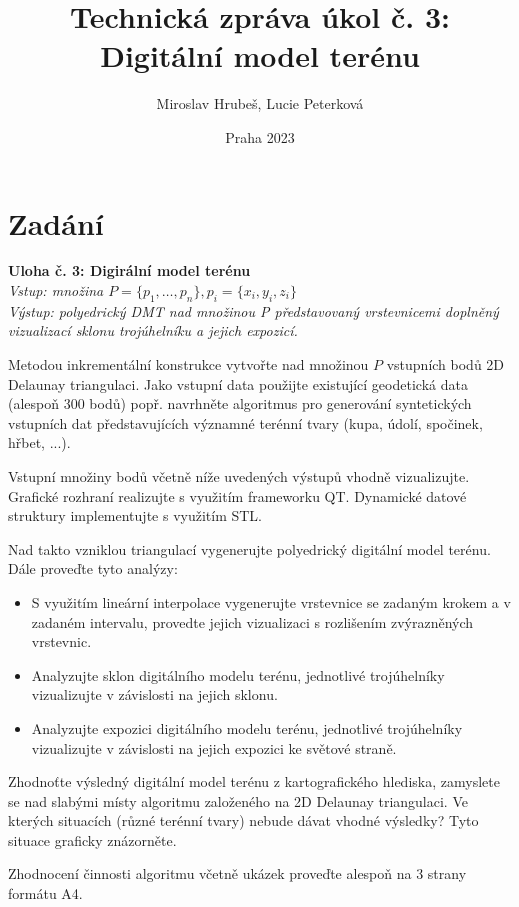 \documentclass[a4paper,12pt]{article}
\title{Technická zpráva úkol č. 3: Digitální model terénu}
\author{Miroslav Hrubeš, Lucie Peterková}
\date{Praha 2023}
\begin{document}
    \maketitle
    \newpage
    \section{Zadání}
    \textbf{Uloha č. 3: Digirální model terénu}\\
    \textit{Vstup: množina $P = \{p_1, \dots, p_n\}, p_i = \{x_i, y_i, z_i\}$}\\
    \textit{Výstup: polyedrický DMT nad množinou P představovaný vrstevnicemi doplněný vizualizací sklonu trojúhelníku a jejich expozicí.}

    Metodou inkrementální konstrukce vytvořte nad množinou $P$ vstupních bodů 2D Delaunay triangulaci. Jako vstupní data použijte existující geodetická data (alespoň 300 bodů) popř. navrhněte algoritmus pro generování syntetických vstupních dat představujících významné terénní tvary (kupa, údolí, spočinek, hřbet, ...).

    Vstupní množiny bodů včetně níže uvedených výstupů vhodně vizualizujte. Grafické rozhraní realizujte s využitím frameworku QT. Dynamické datové struktury implementujte s využitím STL.
    
    Nad takto vzniklou triangulací vygenerujte polyedrický digitální model terénu. Dále proveďte tyto analýzy:
    \begin{itemize}
    \item S využitím lineární interpolace vygenerujte vrstevnice se zadaným krokem a v zadaném intervalu, provedte jejich vizualizaci s rozlišením zvýrazněných vrstevnic.
    \item Analyzujte sklon digitálního modelu terénu, jednotlivé trojúhelníky vizualizujte v závislosti na jejich sklonu.
    \item Analyzujte expozici digitálního modelu terénu, jednotlivé trojúhelníky vizualizujte v závislosti na jejich expozici ke světové straně.
    \end{itemize}
    
    Zhodnoťte výsledný digitální model terénu z kartografického hlediska, zamyslete se nad slabými místy algoritmu založeného na 2D Delaunay triangulaci. Ve kterých situacích (různé terénní tvary) nebude dávat vhodné výsledky? Tyto situace graficky znázorněte.
    
    Zhodnocení činnosti algoritmu včetně ukázek proveďte alespoň na 3 strany formátu A4.
\end{document}
